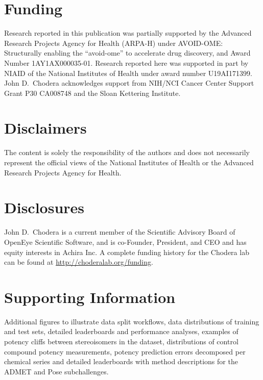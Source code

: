 \documentclass[journal=jcim,manuscript=article]{achemso}
\begin{document}
\section{Funding}

Research reported in this publication was partially supported by the Advanced Research Projects Agency for Health (ARPA-H) under AVOID-OME: Structurally enabling the “avoid-ome” to accelerate drug discovery, and Award Number 1AY1AX000035-01. 
Research reported here was supported in part by NIAID of the National Institutes of Health under award number U19AI171399.
John D.\ Chodera acknowledges support from NIH/NCI Cancer Center Support Grant P30 CA008748 and the Sloan Kettering Institute.

\section{Disclaimers}
The content is solely the responsibility of the authors and does not necessarily represent the official views of the National Institutes of Health or the Advanced Research Projects Agency for Health.

\section{Disclosures}
John D.\ Chodera is a current member of the Scientific Advisory Board of OpenEye Scientific Software, and is co-Founder, President, and CEO and has equity interests in Achira Inc.
A complete funding history for the Chodera lab can be found at \url{http://choderalab.org/funding}.

\section{Supporting Information}
Additional figures to illustrate data split workflows, data distributions of training and test sets, detailed leaderboards and performance analyses, examples of potency cliffs between stereoisomers in the dataset, distributions of control compound potency measurements, potency prediction errors decomposed per chemical series and detailed leaderboards with method descriptions for the ADMET and Pose subchallenges.
\end{document}

